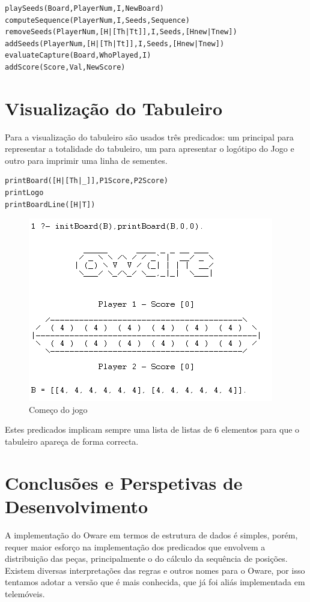 \documentclass[15pt,a4paper]{article}
\begin{document}
 \begin{verbatim}
playSeeds(Board,PlayerNum,I,NewBoard)
computeSequence(PlayerNum,I,Seeds,Sequence)
removeSeeds(PlayerNum,[H|[Th|Tt]],I,Seeds,[Hnew|Tnew])
addSeeds(PlayerNum,[H|[Th|Tt]],I,Seeds,[Hnew|Tnew])
evaluateCapture(Board,WhoPlayed,I)
addScore(Score,Val,NewScore)
\end{verbatim}


\section{Visualização do Tabuleiro}
Para a visualização do tabuleiro são usados três predicados: um principal para representar a totalidade do tabuleiro, um para apresentar o logótipo do Jogo e outro para imprimir uma linha de sementes.

 \begin{verbatim}
printBoard([H|[Th|_]],P1Score,P2Score)
printLogo
printBoardLine([H|T])
\end{verbatim}

\begin{figure}[h!]
	\begin{center}
	\includegraphics[scale=1]{printBoardExample.png}
	\caption{Começo do jogo}
	\label{fig:Comeco}
	\end{center}
\end{figure}

Estes predicados implicam sempre uma lista de listas de 6 elementos para que o tabuleiro apareça de forma correcta.
\newpage
\section{Conclusões e Perspetivas de Desenvolvimento}
\indent A implementação do Oware em termos de estrutura de dados é simples, porém, 
requer maior esforço na implementação dos predicados que envolvem a distribuição das peças, principalmente o do cálculo da sequência de posições. Existem diversas interpretações das regras e outros nomes para o Oware, por isso tentamos adotar a versão que é mais conhecida, que já foi aliás implementada em telemóveis.\\
\end{document}
